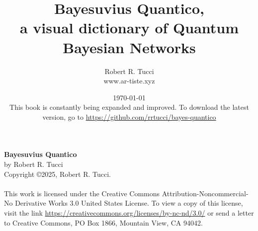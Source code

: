 \documentclass[12pt]{report}
\title{\textbf{Bayesuvius Quantico},
 \\a visual dictionary of
Quantum Bayesian Networks}
\author{Robert R. Tucci\\
        www.ar-tiste.xyz}
\date{\today\\
This book is constantly being expanded and improved.
To download the latest version, go to
\url{https://github.com/rrtucci/bayes-quantico}}
\begin{document}

\maketitle
\newpage
\noindent
{\bf Bayesuvius Quantico}\\
by Robert R. Tucci\\
Copyright \copyright 2025, Robert R. Tucci.\\
\\
This work is licensed under the
Creative Commons Attribution-Noncommercial-No
Derivative Works 3.0 United States License.
 To view a copy of this license, visit the link
\url{https://creativecommons.org/licenses/by-nc-nd/3.0/}
or send a letter to Creative Commons,
 PO Box 1866, Mountain View, CA 94042.
\newpage



\newpage
\setcounter{tocdepth}{10}
\tableofcontents
\begin{appendices}


\end{appendices}
























\end{document}
